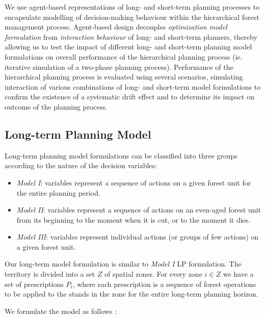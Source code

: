 We use agent-based representations
\citep{frayret2007agent,forget2009study,ouhimmou2009optimization} of
long- and short-term planning processes to encapsulate modelling of
decision-making behaviour within the hierarchical forest management
process. Agent-based design decouples \emph{optimization model
  formulation} from \emph{interaction behaviour} of long- and
short-term planners, thereby allowing us to test the impact of different
long- and short-term planning model formulations on overall
performance of the hierarchical planning process (ie. iterative simulation
of a two-phase planning process).  Performance of the hierarchical planning
process is evaluated using several scenarios, simulating interaction
of various combinations of long- and short-term model formulations
to confirm the existence of a systematic drift effect and to
determine its impact on outcome of the planning process.


\subsection{Long-term Planning Model}
\label{sec:lt-planning-model}

Long-term planning model formulations can be classified into three groups
\citep{gunn2009some, johnson1977techniques,garcia1990linear} according to the nature of the
decision variables:
\begin{itemize}
\item \emph{Model I}: variables represent a sequence of actions on a given
forest unit for the entire planning period.
\item \emph{Model II}: variables represent a sequence of actions on an
  even-aged forest unit from its beginning to the moment when it is
  cut, or to the moment it dies.
\item \emph{Model III}: variables represent individual actions (or groups
of few actions) on a given forest unit.
\end{itemize}

Our long-term model formulation is similar to \emph{Model I} LP formulation.
The territory is divided into a set $Z$ of spatial zones. For every
zone $i\in Z$ we have a set of prescriptions $P_{i}$, where each
prescription is a sequence of forest operations to be applied to the
stands in the zone for the entire long-term planning horizon.

\noindent
We formulate the model as follows :

